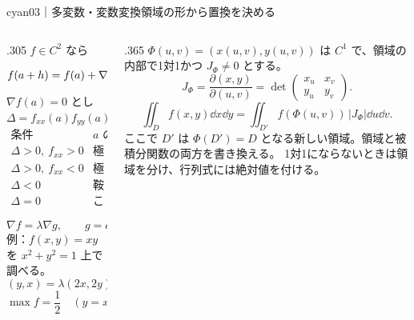 \begin{sheetframe}[50]{cyan}{03｜多変数・変数変換}{領域の形から置換を決める}
\begin{columns}[T,onlytextwidth]
\begin{column}{.305\textwidth}
\separator
{}
$f\in C^2$ なら
\[
f(a+h)=f(a)+\nabla f(a)\cdot h
+\frac12h^{\mathsf T}H_f(a)h+o(\lVert h\rVert^2).
\]
$\nabla f(a)=0$ とし
\[
\Delta=f_{xx}(a)f_{yy}(a)-f_{xy}(a)^2.
\]
\[
\begin{array}{c|c}
\text{条件}&a\text{ の型}\\ \hline
\Delta>0,\ f_{xx}>0&\text{極小}\\
\Delta>0,\ f_{xx}<0&\text{極大}\\
\Delta<0&\text{鞍点}\\
\Delta=0&\text{この判定だけでは不明}
\end{array}
\]

\separator
{}
\[
\boxed{\nabla f=\lambda\nabla g,\qquad g=c.}
\]
例：$f(x,y)=xy$ を $x^2+y^2=1$ 上で調べる。
\[
(y,x)=\lambda(2x,2y)
\Rightarrow y=\pm x.
\]
\[
\max f=\frac12\quad(y=x),\qquad
\min f=-\frac12\quad(y=-x).
\]
\end{column}

\begin{column}{.365\textwidth}
$\Phi(u,v)=(x(u,v),y(u,v))$ は $C^1$ で、領域の内部で1対1かつ $J_\Phi\ne0$ とする。
\[
J_\Phi=
\frac{\partial(x,y)}{\partial(u,v)}
=
\det\begin{pmatrix}
x_u&x_v\\y_u&y_v
\end{pmatrix}.
\]
\[
\boxed{
\iint_D f(x,y)\dd x\dd y
=
\iint_{D'}f(\Phi(u,v))\,|J_\Phi|\dd u\dd v.}
\]
ここで $D'$ は $\Phi(D')=D$ となる新しい領域。領域と被積分関数の両方を書き換える。
1対1にならないときは領域を分け、行列式には絶対値を付ける。


\end{column}
\end{columns}
\end{sheetframe}
